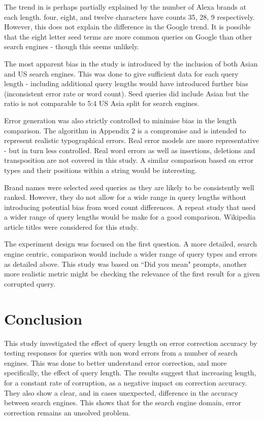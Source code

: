 \documentclass{csfourzero}
\begin{document}
The trend in is perhaps partially explained by the number of Alexa brands at each length. four, eight, and twelve characters have counts 35, 28, 9 respectively. However, this does not explain the difference in the Google trend. It is possible that the eight letter seed terms are more common queries on Google than other search engines - though this seems unlikely.

The most apparent bias in the study is introduced by the inclusion of both Asian and US search engines. This was done to give sufficient data for each query length - including additional query lengths would have introduced further bias (inconsistent error rate or word count). Seed queries did include Asian but the ratio is not comparable to 5:4 US Asia split for search engines.

Error generation was also strictly controlled to minimise bias in the length comparison. The algorithm in Appendix 2 is a compromise and is intended to represent realistic typographical errors. Real error models are more representative - but in turn less controlled. Real word errors as well as insertions, deletions and transposition are not covered in this study. A similar comparison based on error types and their positions within a string would be interesting.

Brand names were selected seed queries as they are likely to be consistently well ranked. However, they do not allow for a wide range in query lengths without introducing potential bias from word count differences. A repeat study that used a wider range of query lengths would be make for a good comparison. Wikipedia article titles were considered for this study.

The experiment design was focused on the first question. A more detailed, search engine centric, comparison would include a wider range of query types and errors as detailed above. This study was based on ``Did you mean" prompts, another more realistic metric might be checking the relevance of the first result for a given corrupted query.

\section{Conclusion}
\label{sec:conc}

This study investigated the effect of query length on error correction accuracy by testing responses for queries with non word errors from a number of search engines. This was done to better understand error correction, and more specifically, the effect of query length. The results suggest that increasing length, for a constant rate of corruption, as a negative impact on correction accuracy. They also show a clear, and in cases unexpected, difference in the accuracy between search engines. This shows that for the search engine domain, error correction remains an unsolved problem.
\end{document}
